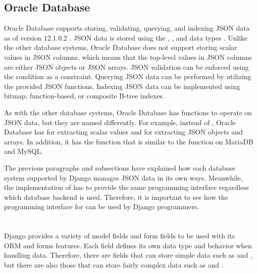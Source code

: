 \subsection{Oracle Database}

Oracle Database supports storing, validating, querying, and indexing JSON data
as of version 12.1.0.2 \cite{oracle:12.1.0.2}. JSON data is stored using the
, , and  data types \cite{oracle:json}.
Unlike the other database systems, Oracle Database does not support storing
scalar values in JSON columns, which means that the top-level values in JSON
columns are either JSON objects or JSON arrays. JSON validation can be enforced
using the  condition as a  constraint. Querying JSON
data can be performed by utilizing the provided JSON functions. Indexing JSON
data can be implemented using bitmap, function-based, or composite B-tree
indexes.

As with the other database systems, Oracle Database has functions to operate on
JSON data, but they are named differently. For example, instead of
, Oracle Database has  for extracting
scalar values and  for extracting JSON objects and arrays. In
addition, it has the  function that is similar to the
 function on MariaDB and MySQL.

The previous paragraphs and subsections have explained how each database
system supported by Django manages JSON data in its own ways. Meanwhile, the
implementation of  has to provide the same programming
interface regardless which database backend is used. Therefore, it is important
to see how the programming interface for  can be used by Django
programmers.

\section{}

Django provides a variety of model fields and form fields to be used with its
ORM and forms features. Each field defines its own data type and behavior when
handling data. Therefore, there are fields that can store simple data such as
 and , but there are also those that can
store fairly complex data such as  and .

